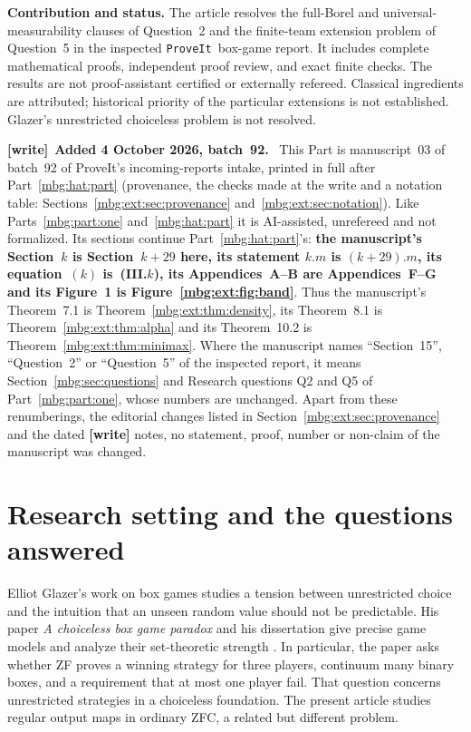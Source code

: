 \documentclass[11pt,letterpaper]{article}
\theoremstyle{definition}
\newcommand{\repo}{\texttt{ProveIt}}
\newenvironment{writenote}[1][]{\par\smallskip\begingroup\small
 \noindent\textbf{[write]}\if\relax\detokenize{#1}\relax\else~\textbf{#1.}\fi\ }%
 {\par\endgroup\smallskip}
\begin{document}
\begin{resultbox}
\textbf{Contribution and status.} The article resolves the full-Borel and universal-measurability clauses of Question~2 and the finite-team extension problem of Question~5 in the inspected \repo\ box-game report. It includes complete mathematical proofs, independent proof review, and exact finite checks. The results are not proof-assistant certified or externally refereed. Classical ingredients are attributed; historical priority of the particular extensions is not established. Glazer's unrestricted choiceless problem is not resolved.
\end{resultbox}

\begin{writenote}[Added 4 October 2026, batch~92]
This Part is manuscript~03 of batch~92 of ProveIt's incoming-reports intake, printed in full after Part~\ref{mbg:hat:part} (provenance, the checks made at the write and a notation table: Sections~\ref{mbg:ext:sec:provenance} and~\ref{mbg:ext:sec:notation}). Like Parts~\ref{mbg:part:one} and~\ref{mbg:hat:part} it is AI-assisted, unrefereed and not formalized. Its sections continue Part~\ref{mbg:hat:part}'s: \textbf{the manuscript's Section~$k$ is Section~$k+29$ here, its statement $k.m$ is $(k+29).m$, its equation~$(k)$ is~(III.$k$), its Appendices~A--B are Appendices~F--G and its Figure~1 is Figure~\ref{mbg:ext:fig:band}}. Thus the manuscript's Theorem~7.1 is Theorem~\ref{mbg:ext:thm:density}, its Theorem~8.1 is Theorem~\ref{mbg:ext:thm:alpha} and its Theorem~10.2 is Theorem~\ref{mbg:ext:thm:minimax}. Where the manuscript names ``Section~15'', ``Question~2'' or ``Question~5'' of the inspected report, it means Section~\ref{mbg:sec:questions} and Research questions Q2 and Q5 of Part~\ref{mbg:part:one}, whose numbers are unchanged. Apart from these renumberings, the editorial changes listed in Section~\ref{mbg:ext:sec:provenance} and the dated \textbf{[write]} notes, no statement, proof, number or non-claim of the manuscript was changed.
\end{writenote}

\section{Research setting and the questions answered}
\label{mbg:ext:sec:setting}

Elliot Glazer's work on box games studies a tension between unrestricted choice and the intuition that an unseen random value should not be predictable. His paper \emph{A choiceless box game paradox} and his dissertation give precise game models and analyze their set-theoretic strength \cite{GlazerBox,ext:GlazerThesis}. In particular, the paper asks whether ZF proves a winning strategy for three players, continuum many binary boxes, and a requirement that at most one player fail. That question concerns unrestricted strategies in a choiceless foundation. The present article studies regular output maps in ordinary ZFC, a related but different problem.
\end{document}
